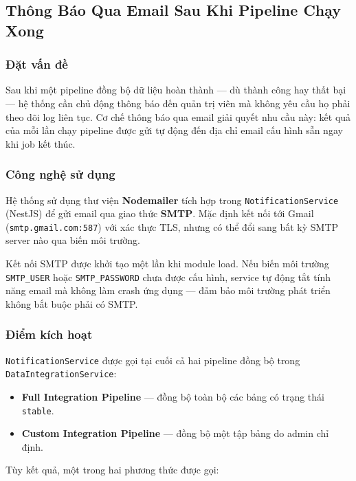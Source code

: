 \subsection{Thông Báo Qua Email Sau Khi Pipeline Chạy Xong}
\label{sec:notification}

\subsubsection{Đặt vấn đề}

Sau khi một pipeline đồng bộ dữ liệu hoàn thành --- dù thành công hay thất
bại --- hệ thống cần chủ động thông báo đến quản trị viên mà không yêu cầu
họ phải theo dõi log liên tục. Cơ chế thông báo qua email giải quyết nhu
cầu này: kết quả của mỗi lần chạy pipeline được gửi tự động đến địa chỉ
email cấu hình sẵn ngay khi job kết thúc.

\subsubsection{Công nghệ sử dụng}

Hệ thống sử dụng thư viện \textbf{Nodemailer} tích hợp trong \texttt{NotificationService}
(NestJS) để gửi email qua giao thức \textbf{SMTP}. Mặc định kết nối tới
Gmail (\texttt{smtp.gmail.com:587}) với xác thực TLS, nhưng có thể đổi sang
bất kỳ SMTP server nào qua biến môi trường.

Kết nối SMTP được khởi tạo một lần khi module load. Nếu biến môi trường
\texttt{SMTP\_USER} hoặc \texttt{SMTP\_PASSWORD} chưa được cấu hình, service
tự động tắt tính năng email mà không làm crash ứng dụng --- đảm bảo môi
trường phát triển không bắt buộc phải có SMTP.

\subsubsection{Điểm kích hoạt}

\texttt{NotificationService} được gọi tại cuối cả hai pipeline đồng bộ trong
\texttt{DataIntegrationService}:

\begin{itemize}
  \item \textbf{Full Integration Pipeline} --- đồng bộ toàn bộ các bảng
        có trạng thái \texttt{stable}.
  \item \textbf{Custom Integration Pipeline} --- đồng bộ một tập bảng do
        admin chỉ định.
\end{itemize}

Tùy kết quả, một trong hai phương thức được gọi:

